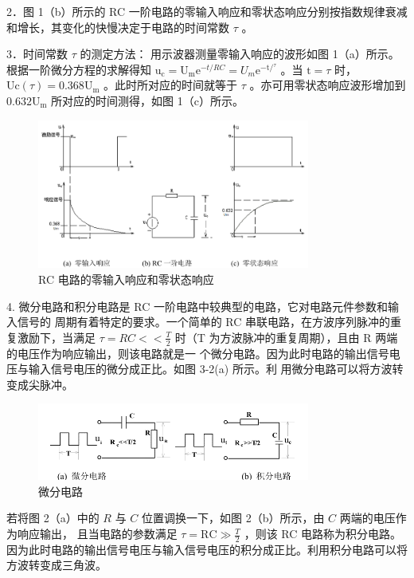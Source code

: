 \documentclass{article}
\begin{document}
2．图 1（b）所示的 RC 一阶电路的零输入响应和零状态响应分别按指数规律衰减和增长，其变化的快慢决定于电路的时间常数 $\tau$ 。

3．时间常数 $\tau$ 的测定方法：
用示波器测量零输入响应的波形如图 1（a）所示。
根据一阶微分方程的求解得知 $\mathrm{u}_{\mathrm{c}}=\mathrm{U}_{\mathrm{m}} \mathrm{e}^{-t / R C}=U_m \mathrm{e}^{-\mathrm{t} /{ }^\tau}$ 。当 $\mathrm{t}=\tau$ 时， $\mathrm{Uc}(\tau)=0.368 \mathrm{U}_{\mathrm{m}}$ 。此时所对应的时间就等于 $\tau$ 。亦可用零状态响应波形增加到 $0.632 \mathrm{U}_{\mathrm{m}}$ 所对应的时间测得，如图 1（c）所示。

\begin{figure}[h]
    \centering
    \includegraphics[width=0.8\textwidth]{img1.png}
    \caption{RC 电路的零输入响应和零状态响应}
    \label{fig:rc_circuit}
\end{figure}

4. 微分电路和积分电路是 RC 一阶电路中较典型的电路，它对电路元件参数和输入信号的
周期有着特定的要求。一个简单的 RC 串联电路，在方波序列脉冲的重复激励下，当满足 
$\tau=RC<<\frac{T}{2}$ 
时（T 为方波脉冲的重复周期），且由 R 两端的电压作为响应输出，则该电路就是一
个微分电路。因为此时电路的输出信号电压与输入信号电压的微分成正比。如图 3-2(a) 所示。利
用微分电路可以将方波转变成尖脉冲。
\begin{figure}[h]
    \centering
    \includegraphics[width=0.8\textwidth]{img2.png}
    \caption{微分电路}
    \label{fig:diff_circuit}
\end{figure}

若将图 2（a）中的 $R$ 与 $C$ 位置调换一下，如图 2（b）所示，由 $C$ 两端的电压作为响应输出，
且当电路的参数满足 $\tau=\mathrm{RC} \gg \frac{T}{2}$ ，则该 RC 电路称为积分电路。
因为此时电路的输出信号电压与输入信号电压的积分成正比。利用积分电路可以将方波转变成三角波。
\end{document}
